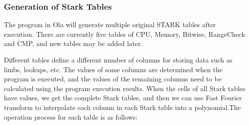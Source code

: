 \subsubsection{Generation of Stark Tables}\label{section: starky-geneartion-tables}

The program in Ola will generate multiple original STARK tables after execution. There are currently five tables of CPU, Memory, Bitwise, RangeCheck and CMP, and new tables may be added later.

Different tables define a different number of columns for storing data such as limbs, lookups, etc. The values of some columns are determined when the program is executed, and the values of the remaining columns need to be calculated using the program execution results. When the cells of all Stark tables have values, we get the complete Stark tables, and then we can use Fast Fourier transform to interpolate each column in each Stark table into a polynomial.The operation process for each table is as follows: